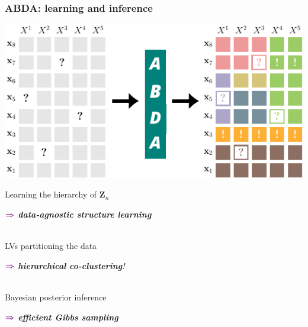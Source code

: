 \documentclass[xcolor={usenames,dvipsnames,svgnames}, compress, aspectratio=169, 11pt]{beamer}
\newcommand{\comment}[3][\small]{\begin{minipage}{1\linewidth}
          \raggedleft
          {
            $\color{violet}\boldsymbol\Rightarrow$
            #1
            {\emph{#2}}
          }
      \end{minipage}#3\\
}
\begin{document}
\begin{frame}[t, htt=bgrey2]
  \frametitle{ABDA: learning and inference}

  \large
  \begin{minipage}[t]{0.5\linewidth}
    \vspace{10pt}
    \includegraphics[width=1.07\linewidth]{figures/abda-partitioning}
  \end{minipage}\hfill\begin{minipage}[t]{0.4\linewidth}
    \raggedright
    \vspace{20pt}

    Learning the hierarchy of
    $\mathbf{Z}_{n}$\\
    \comment[\small]{\textbf{\emph{data-agnostic structure
        learning}}}{}%

  \vspace{10pt}
  LVs partitioning the data\\
  \comment[\small]{\textbf{hierarchical co-clustering}!}{}

  \vspace{10pt}
  Bayesian posterior inference\\
  \comment[\small]{\textbf{efficient Gibbs sampling}}{}
    
  \end{minipage}  
\end{frame}


    
\end{document}
